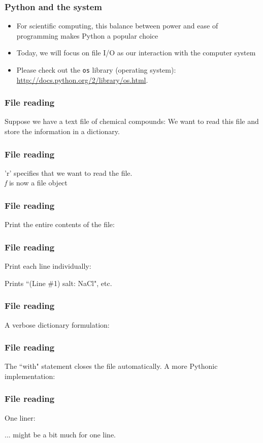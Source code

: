 \documentclass{beamer}
\begin{document}
\begin{frame}
\frametitle{Python and the system}
\begin{itemize}
\setlength{\itemsep}{0.1in}
\item{For scientific computing, this balance between power and ease of programming makes Python a popular choice}
\item{Today, we will focus on file I/O as our interaction with the computer system}
\item{Please check out the \texttt{os} library (operating system): \url{http://docs.python.org/2/library/os.html}.}
\end{itemize}
\end{frame}

\begin{frame}
\frametitle{File reading}
Suppose we have a text file of chemical compounds:
We want to read this file and store the information in a dictionary.
\end{frame}

\begin{frame}
\frametitle{File reading}
'r'  specifies that we want to read the file. \\
\vspace{0.1in}
\emph{f} is now a file object
\end{frame}

\begin{frame}
\frametitle{File reading}
Print the entire contents of the file:
\end{frame}

\begin{frame}
\frametitle{File reading}
Print each line individually:

\vspace{0.3in}
Prints ``(Line \#1) salt: NaCl", etc.
\end{frame}


\begin{frame}
\frametitle{File reading}
A verbose dictionary formulation:
\end{frame}


\begin{frame}
\frametitle{File reading}
The ``with" statement closes the file automatically.  A more Pythonic implementation:
\end{frame}

\begin{frame}
\frametitle{File reading}
One liner:

\vspace{0.3in}
... might be a bit much for one line.
\end{frame}
\end{document}
